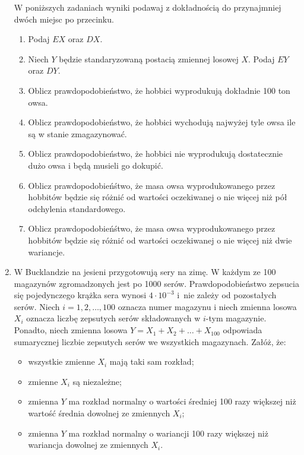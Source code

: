 \documentclass{mwart}
\begin{document}
\begin{enumerate}
W poniższych zadaniach wyniki podawaj z dokładnością do przynajmniej dwóch miejsc po przecinku.
\begin{enumerate}
\item Podaj $EX$ oraz $DX$.
\item Niech $Y$ będzie standaryzowaną postacią zmiennej losowej $X$. Podaj $EY$ oraz $DY$.
\item Oblicz prawdopodobieństwo, że hobbici wyprodukują dokładnie 100 ton owsa.
\item Oblicz prawdopodobieństwo, że hobbici wychodują najwyżej tyle owsa ile są w stanie zmagazynować.
\item Oblicz prawdopodobieństwo, że hobbici nie wyprodukują dostatecznie dużo owsa i będą musieli go dokupić.
\item Oblicz prawdopodobieńśtwo, że masa owsa wyprodukowanego przez hobbitów będzie się różnić od wartości oczekiwanej o nie więcej niż pół odchylenia standardowego.
\item Oblicz prawdopodobieńśtwo, że masa owsa wyprodukowanego przez hobbitów będzie się różnić od wartości oczekiwanej o nie więcej niż dwie wariancje.
\end{enumerate}

\item W Bucklandzie na jesieni przygotowują sery na zimę. W każdym ze 100 magazynów
zgromadzonych jest po 1000 serów. Prawdopodobieństwo zepsucia się pojedynczego
krążka sera wynosi $4\cdot 10^{-3}$ i~nie zależy od pozostałych serów. Niech
$i=1,2,\ldots,100$ oznacza numer magazynu i niech zmienna losowa $X_i$ oznacza
liczbę zepsutych serów składowanych w $i$-tym magazynie. Ponadto, niech zmienna
losowa $Y=X_1+X_2+\ldots+X_{100}$ odpowiada sumarycznej liczbie zepsutych serów
we wszystkich magazynach. Załóż, że:
\begin{itemize}
\item wszystkie zmienne $X_i$ mają taki sam rozkład;
\item zmienne $X_i$ są niezależne;
\item zmienna $Y$ ma rozkład normalny o wartości średniej 100 razy większej niż wartość średnia dowolnej ze zmiennych $X_i$;
\item zmienna $Y$ ma rozkład normalny o wariancji 100 razy większej niż wariancja dowolnej ze zmiennych $X_i$.
\end{itemize}


\end{enumerate}
\end{document}
